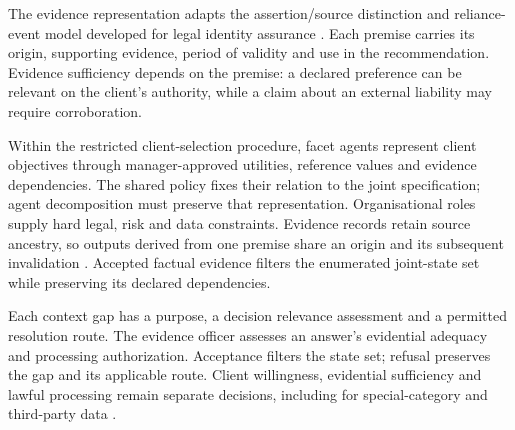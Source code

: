 \documentclass[oneside,10pt,english]{swissi}
\begin{document}
The evidence representation adapts the assertion/source distinction and reliance-event model developed for legal identity assurance \parencite{kurz2026identity}. Each premise carries its origin, supporting evidence, period of validity and use in the recommendation. Evidence sufficiency depends on the premise: a declared preference can be relevant on the client's authority, while a claim about an external liability may require corroboration.

Within the restricted client-selection procedure, facet agents represent client objectives through manager-approved utilities, reference values and evidence dependencies. The shared policy fixes their relation to the joint specification; agent decomposition must preserve that representation. Organisational roles supply hard legal, risk and data constraints. Evidence records retain source ancestry, so outputs derived from one premise share an origin and its subsequent invalidation \parencite{kurz2026identity}. Accepted factual evidence filters the enumerated joint-state set while preserving its declared dependencies.

Each context gap has a purpose, a decision relevance assessment and a permitted resolution route. The evidence officer assesses an answer's evidential adequacy and processing authorization. Acceptance filters the state set; refusal preserves the gap and its applicable route. Client willingness, evidential sufficiency and lawful processing remain separate decisions, including for special-category and third-party data \parencite[arts.~5--7, 9 and 14]{europeanunion2016gdpr}.
\end{document}
